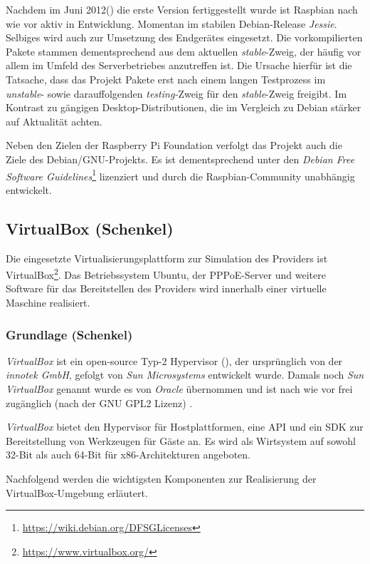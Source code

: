 Nachdem im Juni 2012(\cite{raspbianweb}) die erste
Version fertiggestellt wurde ist Raspbian nach wie vor aktiv
in Entwicklung. Momentan im stabilen Debian-Release \textit{Jessie}.
Selbiges wird auch zur Umsetzung des Endgerätes eingesetzt.
Die vorkompilierten Pakete stammen dementsprechend aus dem aktuellen
\textit{stable}-Zweig, der häufig vor allem im Umfeld des Serverbetriebes
anzutreffen ist. Die Ursache hierfür ist die Tatsache, dass das
Projekt Pakete erst nach einem langen Testprozess im \textit{unstable}-
sowie darauffolgenden \textit{testing-}Zweig für den \textit{stable}-Zweig
freigibt. Im Kontrast zu gängigen Desktop-Distributionen, die
im Vergleich zu Debian stärker auf Aktualität achten.

Neben den Zielen der Raspberry Pi Foundation verfolgt das Projekt
auch die Ziele des Debian/GNU-Projekts. Es ist dementsprechend unter
den \textit{Debian Free Software Guidelines}\footnote{\url{https://wiki.debian.org/DFSGLicenses}}
lizenziert und durch die Raspbian-Community unabhängig entwickelt.
  
\subsection{VirtualBox (Schenkel)}
Die eingesetzte Virtualisierungsplattform zur Simulation des Providers ist VirtualBox\footnote{\url{https://www.virtualbox.org/}}. Das Betriebssystem Ubuntu, der PPPoE-Server und weitere Software für
das Bereitstellen des Providers wird innerhalb einer virtuelle Maschine realisiert.

\subsubsection{Grundlage (Schenkel)}
\textit{VirtualBox} ist ein open-source Typ-2 Hypervisor (), der
ursprünglich von der \textit{innotek GmbH}, gefolgt von \textit{Sun Microsystems} entwickelt wurde.
Damals noch \textit{Sun VirtualBox} genannt wurde es von \textit{Oracle} übernommen und ist
nach wie vor frei zugänglich (nach der GNU GPL2 Lizenz) \cite{dash13}.

\textit{VirtualBox} bietet den Hypervisor für Hostplattformen, eine API und ein SDK zur
Bereitstellung von Werkzeugen für Gäste an. Es wird als Wirtsystem auf sowohl 32-Bit als auch
64-Bit für x86-Architekturen angeboten.

Nachfolgend werden die wichtigsten Komponenten zur Realisierung der VirtualBox-Umgebung
erläutert.

